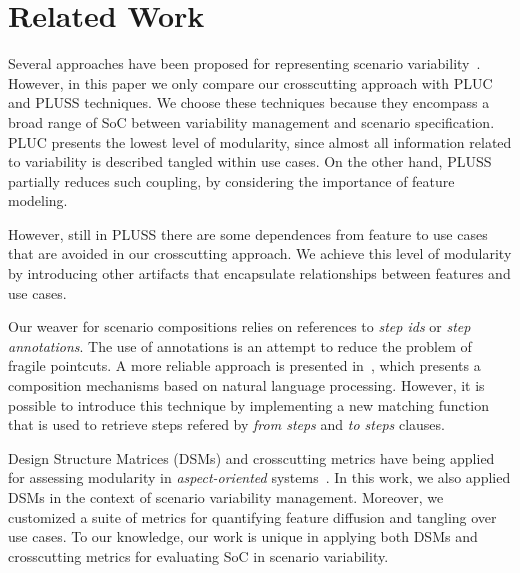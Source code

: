 \documentclass{acm_proc_article-sp}
\begin{document}
\section{Related Work}
\label{related-work}

Several approaches have been proposed for representing 
scenario variability~\cite{jacobson-reuse-book, favaro-icsr-98, eriksson-splc-2005,bertolino-esec-2003}. However, in this 
paper we only compare our crosscutting approach with PLUC and 
PLUSS techniques. We choose these techniques because they encompass a broad range of SoC between 
variability management and scenario specification. PLUC presents the lowest level of 
modularity, since almost all information related to variability is described tangled within use cases. On the other hand, PLUSS 
partially reduces such coupling, by considering the importance of feature modeling.
 
However, still in PLUSS there are some dependences from feature to use cases that are avoided in our crosscutting approach. We 
achieve this level of modularity by introducing other artifacts that encapsulate relationships between features and use cases. 

Our weaver for scenario compositions relies on references to \emph{step ids} or \emph{step annotations}. The use of annotations is an attempt to reduce the problem of fragile pointcuts. A more reliable approach is presented in~\cite{rashid-aosd-2007}, which presents a composition mechanisms based on natural language processing. However, it is possible to introduce this technique by implementing a new matching function that is used to retrieve steps refered by \emph{from steps} and \emph{to steps} clauses.

Design Structure Matrices (DSMs) and crosscutting metrics have being applied for assessing modularity in \emph{aspect-oriented} 
systems~\cite{vlopes-aosd-2005, sullivan-fse-2005,garcia-taosd-2005, greenwood-ecoop-2007}. In this work, we also applied DSMs in the context of scenario variability management. Moreover, we customized a suite of metrics for quantifying feature diffusion and tangling over use cases. To our knowledge, our work is unique in applying both DSMs and crosscutting metrics for evaluating SoC in scenario variability.


\end{document}
